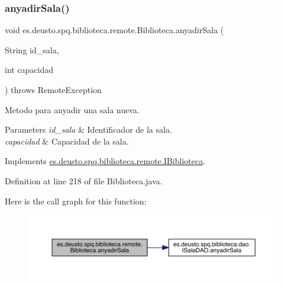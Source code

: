 \subsubsection{\texorpdfstring{anyadir\+Sala()}{anyadirSala()}}
{\footnotesize\ttfamily void es.\+deusto.\+spq.\+biblioteca.\+remote.\+Biblioteca.\+anyadir\+Sala (\begin{DoxyParamCaption}\item[{String}]{id\+\_\+sala,  }\item[{int}]{capacidad }\end{DoxyParamCaption}) throws Remote\+Exception}

Metodo para anyadir una sala nueva. 
\begin{DoxyParams}{Parameters}
{\em id\+\_\+sala} & Identificador de la sala. \\
\hline
{\em capacidad} & Capacidad de la sala. \\
\hline
\end{DoxyParams}


Implements \mbox{\hyperlink{interfacees_1_1deusto_1_1spq_1_1biblioteca_1_1remote_1_1_i_biblioteca_a3f32377ccce2450ce8154902b470bf5b}{es.\+deusto.\+spq.\+biblioteca.\+remote.\+I\+Biblioteca}}.



Definition at line 218 of file Biblioteca.\+java.

Here is the call graph for this function\+:
\nopagebreak
\begin{figure}[H]
\begin{center}
\leavevmode
\includegraphics[width=350pt]{classes_1_1deusto_1_1spq_1_1biblioteca_1_1remote_1_1_biblioteca_ada19ff59e03ece674f64ac191ba87c29_cgraph}
\end{center}
\end{figure}
\mbox{\label{classes_1_1deusto_1_1spq_1_1biblioteca_1_1remote_1_1_biblioteca_a8657b2e8a0f290b26854518289c4b977}} 
